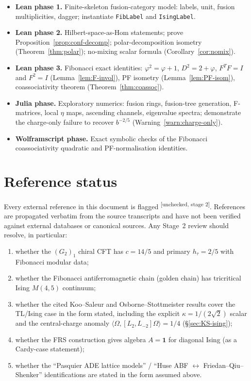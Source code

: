 \documentclass[11pt,a4paper]{article}
\theoremstyle{definition}
\newcommand{\one}{\mathbf{1}}
\newcommand{\unchecked}{\textsuperscript{\textcolor{red!70!black}{[unchecked, stage 2]}}}
\begin{document}
\begin{itemize}[leftmargin=*]
\item \textbf{Lean phase 1.} Finite-skeleton fusion-category model: labels,
unit, fusion multiplicities, dagger; instantiate \texttt{FibLabel} and
\texttt{IsingLabel}.
\item \textbf{Lean phase 2.} Hilbert-space-as-Hom statements; prove
Proposition~\ref{prop:conf-decomp}; polar-decomposition isometry
(Theorem~\ref{thm:polar}); no-mixing scalar formula (Corollary~\ref{cor:nomix}).
\item \textbf{Lean phase 3.} Fibonacci exact identities: $\varphi^2=\varphi+1$,
$D^2=2+\varphi$, $F^{T}F=I$ and $F^{2}=I$ (Lemma~\ref{lem:F-invol}),
PF isometry (Lemma~\ref{lem:PF-isom}), coassociativity theorem
(Theorem~\ref{thm:coassoc}).
\item \textbf{Julia phase.} Exploratory numerics: fusion rings, fusion-tree
generation, F-matrices, local $\eta$ maps, ascending channels, eigenvalue
spectra; demonstrate the charge-only failure to recover $b^{-2/5}$
(Warning~\ref{warn:charge-only}).
\item \textbf{Wolframscript phase.} Exact symbolic checks of the Fibonacci
coassociativity quadratic and PF-normalisation identities.
\end{itemize}

\section*{Reference status}

Every external reference in this document is flagged \unchecked. References
are propagated verbatim from the source transcripts and have not been
verified against external databases or canonical sources. Any Stage~2
review should resolve, in particular:
\begin{enumerate}[label=(\arabic*)]
\item whether the $(G_2)_1$ chiral CFT has $c=14/5$ and primary $h_\tau=2/5$
      with Fibonacci modular data;
\item whether the Fibonacci antiferromagnetic chain (golden chain) has
      tricritical Ising $M(4,5)$ continuum;
\item whether the cited Koo--Saleur and Osborne--Stottmeister results cover
      the TL/Ising case in the form stated, including the explicit
      $\kappa = 1/(2\sqrt 2)$ scalar and the central-charge anomaly
      $\langle\Omega,[L_2,L_{-2}]\Omega\rangle = 1/4$
      (\S\ref{sec:KS-ising});
\item whether the FRS construction gives algebra $A=\one$ for diagonal
      Ising (as a Cardy-case statement);
\item whether the ``Pasquier ADE lattice models'' / ``Huse ABF $\leftrightarrow$
      Friedan--Qiu--Shenker'' identifications are stated in the form
      assumed above.
\end{enumerate}
\end{document}
